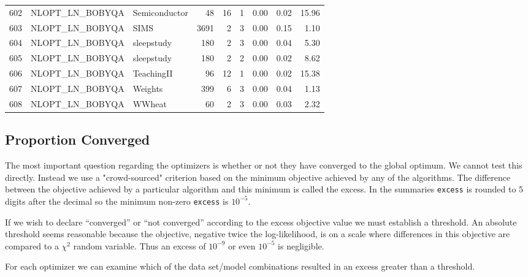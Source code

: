 \documentclass[article]{jss}
\begin{document}
\begin{table}[htbp]
\begin{tabular}{rllrrrrrr}
  602 & NLOPT\_LN\_BOBYQA & Semiconductor &  48 &  16 &   1 & 0.00 & 0.02 & 15.96 \\ 
  603 & NLOPT\_LN\_BOBYQA & SIMS & 3691 &   2 &   3 & 0.00 & 0.15 & 1.10 \\ 
  604 & NLOPT\_LN\_BOBYQA & sleepstudy & 180 &   2 &   3 & 0.00 & 0.04 & 5.30 \\ 
  605 & NLOPT\_LN\_BOBYQA & sleepstudy & 180 &   2 &   2 & 0.00 & 0.02 & 8.62 \\ 
  606 & NLOPT\_LN\_BOBYQA & TeachingII &  96 &  12 &   1 & 0.00 & 0.02 & 15.38 \\ 
  607 & NLOPT\_LN\_BOBYQA & Weights & 399 &   6 &   3 & 0.00 & 0.04 & 1.13 \\ 
  608 & NLOPT\_LN\_BOBYQA & WWheat &  60 &   2 &   3 & 0.00 & 0.03 & 2.32 \\ 
   \hline
\end{tabular}
\end{table}







\subsection[Convergence]{Proportion Converged}



The most important question regarding the optimizers is whether or not they have converged to the global optimum. We cannot test this directly. Instead we use a "crowd-sourced" criterion based on the minimum objective achieved by any of the algorithms. The difference between the objective achieved by a particular algorithm and this minimum is called the excess. In the summaries \texttt{excess} is rounded to 5 digits after the decimal so the minimum non-zero \texttt{excess} is $10^{-5}$.





  If we wish to declare ``converged'' or ``not converged'' according to
the excess objective value we must establish a threshold. An absolute
threshold seems reasonable because the objective, negative twice the
log-likelihood, is on a scale where differences in this objective are
compared to a $\chi^2$ random variable. Thus an excess of $10^{-9}$ or
even $10^{-5}$ is negligible.

For each optimizer we can examine which of the data set/model
combinations resulted in an excess greater than a threshold.
\end{document}
